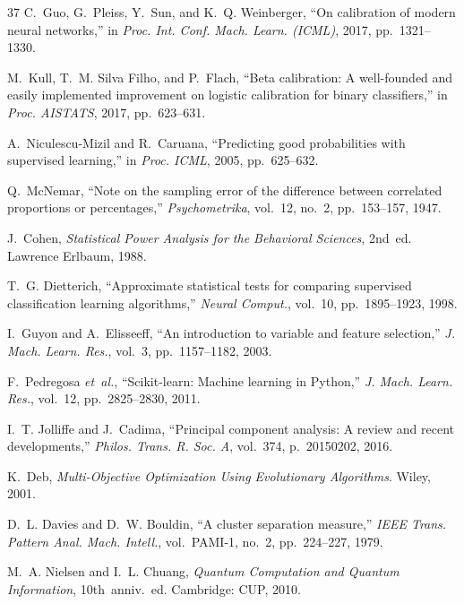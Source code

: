 \documentclass[journal]{IEEEtran}
\begin{document}
\begin{thebibliography}{37}
  C.~Guo, G.~Pleiss, Y.~Sun, and K.~Q. Weinberger,
  ``On calibration of modern neural networks,'' in
  \emph{Proc. Int. Conf. Mach. Learn. (ICML)}, 2017, pp.~1321--1330.

  M.~Kull, T.~M. Silva Filho, and P.~Flach,
  ``Beta calibration: A well-founded and easily implemented
    improvement on logistic calibration for binary classifiers,''
  in \emph{Proc. AISTATS}, 2017, pp.~623--631.

  A.~Niculescu-Mizil and R.~Caruana, ``Predicting good probabilities
    with supervised learning,'' in \emph{Proc. ICML}, 2005,
    pp.~625--632.

  Q.~McNemar, ``Note on the sampling error of the difference between
    correlated proportions or percentages,''
  \emph{Psychometrika}, vol.~12, no.~2, pp.~153--157, 1947.

  J.~Cohen, \emph{Statistical Power Analysis for the Behavioral
    Sciences}, 2nd~ed. Lawrence Erlbaum, 1988.

  T.~G. Dietterich, ``Approximate statistical tests for comparing
    supervised classification learning algorithms,''
  \emph{Neural Comput.}, vol.~10, pp.~1895--1923, 1998.

  I.~Guyon and A.~Elisseeff, ``An introduction to variable and
    feature selection,'' \emph{J. Mach. Learn. Res.}, vol.~3,
    pp.~1157--1182, 2003.

  F.~Pedregosa \emph{et~al.}, ``Scikit-learn: Machine learning in
    Python,'' \emph{J. Mach. Learn. Res.}, vol.~12,
    pp.~2825--2830, 2011.

  I.~T. Jolliffe and J.~Cadima, ``Principal component analysis: A
    review and recent developments,''
  \emph{Philos. Trans. R. Soc. A}, vol.~374, p.~20150202, 2016.

  K.~Deb, \emph{Multi-Objective Optimization Using Evolutionary
    Algorithms}. Wiley, 2001.

  D.~L. Davies and D.~W. Bouldin, ``A cluster separation measure,''
  \emph{IEEE Trans. Pattern Anal. Mach. Intell.}, vol.~PAMI-1,
    no.~2, pp.~224--227, 1979.

  M.~A. Nielsen and I.~L. Chuang, \emph{Quantum Computation and
    Quantum Information}, 10th~anniv.~ed. Cambridge: CUP, 2010.


\end{thebibliography}
\end{document}
